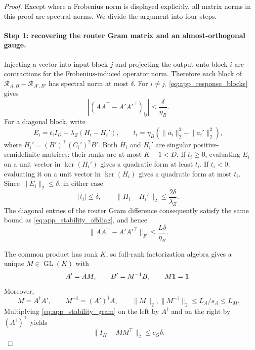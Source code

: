 \begin{proof}
Except where a Frobenius norm is displayed explicitly, all matrix norms in
this proof are spectral norms.  We divide the argument into four steps.

\paragraph{Step 1: recovering the router Gram matrix and an almost-orthogonal
gauge.}
Injecting a vector into input block \(j\) and projecting the output onto block
\(i\) are contractions for the Frobenius-induced operator norm.  Therefore
each block of
\(\mathcal R_{A,B}-\mathcal R_{A',B'}\) has spectral norm at most
\(\delta\).  For \(i\ne j\), \eqref{eq:app_response_blocks} gives
\begin{equation}
 \left|(AA^\top-A'A'^\top)_{ij}\right|
 \le\frac{\delta}{\eta_B}.
 \label{eq:app_stability_offdiag}
\end{equation}
For a diagonal block, write
\begin{equation}
 E_i=t_iI_D+\lambda_Z(H_i-H_i'),\qquad
 t_i=\eta_B(\|a_i\|_2^2-\|a_i'\|_2^2),
 \label{eq:app_stability_diagblock}
\end{equation}
where \(H_i'=(B')^\top(C_i')^2B'\).  Both \(H_i\) and \(H_i'\) are singular
positive-semidefinite matrices: their ranks are at most \(K-1<D\).  If
\(t_i\ge0\), evaluating \(E_i\) on a unit vector in
\(\ker(H_i')\) gives a quadratic form at least \(t_i\).  If \(t_i<0\),
evaluating it on a unit vector in \(\ker(H_i)\) gives a quadratic form at most
\(t_i\).  Since \(\|E_i\|_2\le\delta\), in either case
\begin{equation}
 |t_i|\le\delta,\qquad
 \|H_i-H_i'\|_2\le\frac{2\delta}{\lambda_Z}.
 \label{eq:app_stability_diagseparate}
\end{equation}
The diagonal entries of the router Gram difference consequently satisfy the
same bound as \eqref{eq:app_stability_offdiag}, and hence
\begin{equation}
 \|AA^\top-A'A'^\top\|_F\le\frac{L\delta}{\eta_B}.
 \label{eq:app_stability_gram}
\end{equation}

The common product has rank \(K\), so full-rank factorization algebra gives a
unique \(M\in\operatorname{GL}(K)\) with
\begin{equation}
 A'=AM,\qquad B'=M^{-1}B,\qquad M\mathbf{1}=\mathbf{1}.
 \label{eq:app_stability_M}
\end{equation}
Moreover,
\begin{equation}
 M=A^\dagger A',\qquad
 M^{-1}=(A')^\dagger A,\qquad
 \|M\|_2,\|M^{-1}\|_2\le L_A/s_A\le L_M.
 \label{eq:app_stability_M_bounds}
\end{equation}
Multiplying \eqref{eq:app_stability_gram} on the left by \(A^\dagger\)
and on the right by \((A^\dagger)^\top\) yields
\begin{equation}
 \|I_K-MM^\top\|_2\le c_G\delta.
 \label{eq:app_stability_almost_orthogonal}
\end{equation}


\end{proof}
